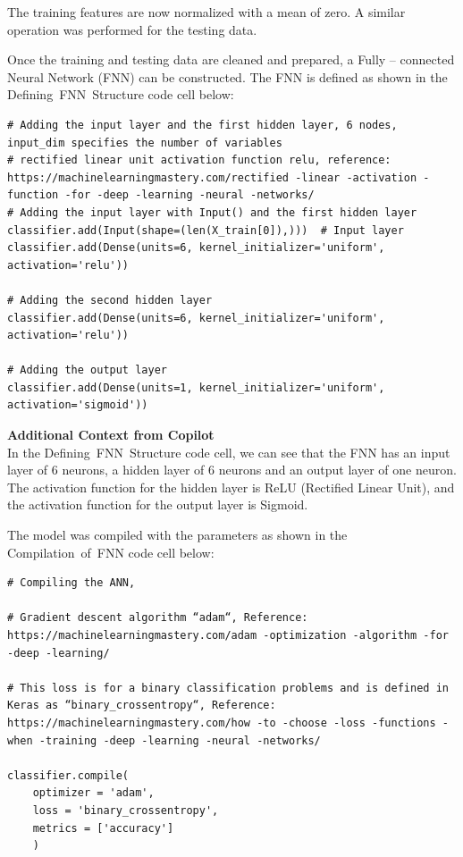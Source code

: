 The training features are now normalized with a mean of zero.  A similar operation was performed for the testing data.

Once the training and testing data are cleaned and prepared, a Fully -- connected Neural Network (FNN) can be constructed.  The FNN is defined as shown in the Defining~FNN~Structure code cell below:

\begin{verbatim}
# Adding the input layer and the first hidden layer, 6 nodes, input_dim specifies the number of variables
# rectified linear unit activation function relu, reference: https://machinelearningmastery.com/rectified -linear -activation -function -for -deep -learning -neural -networks/
# Adding the input layer with Input() and the first hidden layer
classifier.add(Input(shape=(len(X_train[0]),)))  # Input layer
classifier.add(Dense(units=6, kernel_initializer='uniform', activation='relu'))

# Adding the second hidden layer
classifier.add(Dense(units=6, kernel_initializer='uniform', activation='relu'))

# Adding the output layer
classifier.add(Dense(units=1, kernel_initializer='uniform', activation='sigmoid'))
\end{verbatim}

\begin{framed}
\textbf{Additional Context from Copilot}\\
In the Defining~FNN~Structure code cell, we can see that the FNN has an input layer of 6 neurons, a hidden layer of 6 neurons and an output layer of one neuron.  The activation function for the hidden layer is ReLU (Rectified Linear Unit), and the activation function for the output layer is Sigmoid.
\end{framed}

The model was compiled with the parameters as shown in the Compilation~of~FNN code cell below:

\begin{verbatim}
# Compiling the ANN, 

# Gradient descent algorithm “adam“, Reference: https://machinelearningmastery.com/adam -optimization -algorithm -for -deep -learning/

# This loss is for a binary classification problems and is defined in Keras as “binary_crossentropy“, Reference: https://machinelearningmastery.com/how -to -choose -loss -functions -when -training -deep -learning -neural -networks/

classifier.compile(
    optimizer = 'adam', 
    loss = 'binary_crossentropy', 
    metrics = ['accuracy']
    )
\end{verbatim}


